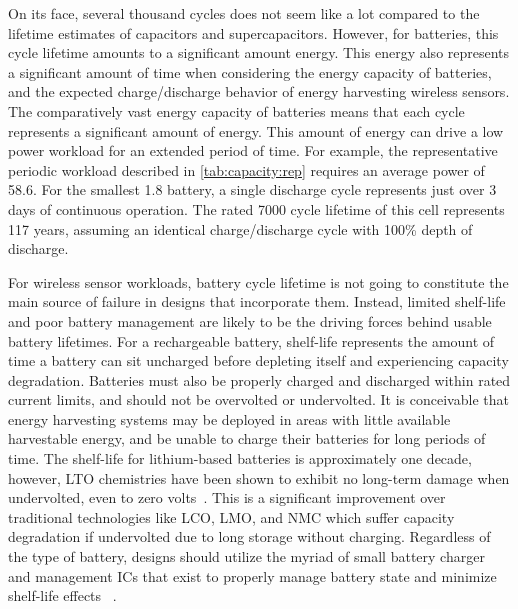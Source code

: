 On its face, several thousand cycles does not seem like a lot compared to the lifetime estimates of capacitors and supercapacitors. However, for batteries, this cycle lifetime amounts to a significant amount energy. This energy also represents a significant amount of time when considering the energy capacity of batteries, and the expected charge/discharge behavior of energy harvesting wireless sensors.
The comparatively vast energy capacity of batteries means that each cycle represents a significant amount of energy. This amount of energy can drive a low power workload for an extended period of time. For example, the representative periodic workload described in \cref{tab:capacity:rep} requires an average power of 58.6\ssi{\micro\watt}. For the smallest 1.8\ssi{\milli\Ah} battery, a single discharge cycle represents just over 3 days of continuous operation. The rated 7000 cycle lifetime of this cell represents 117 years, assuming an identical charge/discharge cycle with 100\% depth of discharge. 

For wireless sensor workloads, battery cycle lifetime is not going to constitute the main source of failure in designs that incorporate them. Instead, limited shelf-life and poor battery management are likely to be the driving forces behind usable battery lifetimes. 
For a rechargeable battery, shelf-life represents the amount of time a battery can sit uncharged before depleting itself and experiencing capacity degradation. Batteries must also be properly charged and discharged within rated current limits, and should not be overvolted or undervolted. 
It is conceivable that energy harvesting systems may be deployed in areas with little available harvestable energy, and be unable to charge their batteries for long periods of time. 
The shelf-life for lithium-based batteries is approximately one decade, however, LTO chemistries have been shown to exhibit no long-term 
damage when undervolted, even to zero volts~\cite{brunell2016effect}.
This is a significant improvement over traditional technologies like LCO, LMO, and NMC which suffer capacity degradation if undervolted due to long storage without charging. 
Regardless of the type of battery, designs should utilize the myriad of small battery charger and management ICs that exist to properly manage battery state and minimize shelf-life effects ~\cite{ltc4071Datasheet,bq25505,adp5091}.

